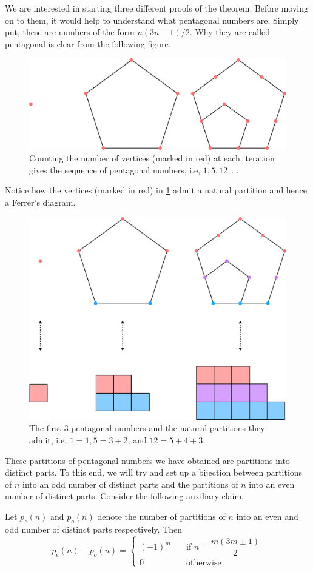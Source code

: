 We are interested in starting three different proofs of the theorem. Before moving on to them, it would help to understand what pentagonal numbers are. Simply put, these are numbers of the form $n(3n-1)/2$. Why they are called pentagonal is clear from the following figure.
\begin{figure}[H]
    \centering
    \includegraphics[width=0.8\linewidth]{Images/Figure20.png}
    \caption{Counting the number of vertices (marked in red) at each iteration gives the sequence of pentagonal numbers, i.e, $1,5,12,\ldots$}
    \label{f:PNT}
\end{figure}
Notice how the vertices (marked in red) in \cref{f:PNT} admit a natural partition and hence a Ferrer's diagram. 
\begin{figure}[H]
    \centering
    \includegraphics[width=0.8\linewidth]{Images/Figure21.png}
    \caption{The first $3$ pentagonal numbers and the natural partitions they admit, i.e, $1=1, 5=3+2$, and $12=5+4+3$.}
\end{figure}
These partitions of pentagonal numbers we have obtained are partitions into distinct parts. To this end, we will try and set up a bijection between partitions of $n$ into an odd number of distinct parts and the partitions of $n$ into an even number of distinct parts. Consider the following auxiliary claim.
\begin{claim}
Let $p_{e}(n)$ and $p_{o}(n)$ denote the number of partitions of $n$ into an even and odd number of distinct parts respectively. Then
\[
p_{e}(n)-p_{o}(n) = \begin{cases}
    (-1)^m \quad &\text{if } n = \dfrac{m(3m\pm 1)}{2} \\
    0 \quad &\text{otherwise}
\end{cases}
\]
\label{t:EPT_Aux}
\end{claim}
